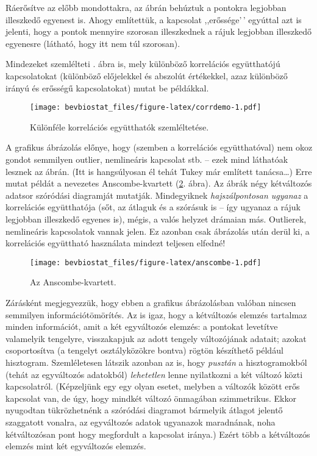 \documentclass[
]{book}
\begin{document}
Ráerősítve az előbb mondottakra, az ábrán behúztuk a pontokra legjobban illeszkedő egyenest is. Ahogy említettük, a kapcsolat ,,erőssége'\,' egyúttal azt is jelenti, hogy a pontok mennyire szorosan illeszkednek a rájuk legjobban illeszkedő egyenesre (látható, hogy itt nem túl szorosan).

Mindezeket szemlélteti . ábra is, mely különböző korrelációs együtthatójú kapcsolatokat (különböző előjelekkel és abszolút értékekkel, azaz különböző irányú és erősségű kapcsolatokat) mutat be példákkal.

\begin{figure}
\centering
\texttt{[image: bevbiostat\_files/figure-latex/corrdemo-1.pdf]}
\caption{\label{fig:corrdemo}Különféle korrelációs együtthatók szemléltetése.}
\end{figure}

A grafikus ábrázolás előnye, hogy (szemben a korrelációs együtthatóval) nem okoz gondot semmilyen outlier, nemlineáris kapcsolat stb. -- ezek mind láthatóak lesznek az ábrán. (Itt is hangsúlyosan él tehát Tukey már említett tanácsa\dots{}) Erre mutat példát a nevezetes Anscombe-kvartett (\ref{fig:anscombe}. ábra). Az ábrák négy kétváltozós adatsor szóródási diagramját mutatják. Mindegyiknek \emph{hajszálpontosan ugyanaz} a korrelációs együtthatója (sőt, az átlaguk és a szórásuk is -- így ugyanaz a rájuk legjobban illeszkedő egyenes is), mégis, a valós helyzet drámaian más. Outlierek, nemlineáris kapcsolatok vannak jelen. Ez azonban csak ábrázolás után derül ki, a korrelációs együttható használata mindezt teljesen elfedné!

\begin{figure}
\centering
\texttt{[image: bevbiostat\_files/figure-latex/anscombe-1.pdf]}
\caption{\label{fig:anscombe}Az Anscombe-kvartett.}
\end{figure}

Zárásként megjegyezzük, hogy ebben a grafikus ábrázolásban valóban nincsen semmilyen információtömörítés. Az is igaz, hogy a kétváltozós elemzés tartalmaz minden információt, amit a két egyváltozós elemzés: a pontokat levetítve valamelyik tengelyre, visszakapjuk az adott tengely változójának adatait; azokat csoportosítva (a tengelyt osztályközökre bontva) rögtön készíthető például hisztogram. Szemléletesen látszik azonban az is, hogy \emph{pusztán} a hisztogramokból (tehát az egyváltozós adatokból) \emph{lehetetlen} lenne nyilatkozni a két változó közti kapcsolatról. (Képzeljünk egy egy olyan esetet, melyben a változók között erős kapcsolat van, de úgy, hogy mindkét változó önmagában szimmetrikus. Ekkor nyugodtan tükrözhetnénk a szóródási diagramot bármelyik átlagot jelentő szaggatott vonalra, az egyváltozós adatok ugyanazok maradnának, noha kétváltozósan pont hogy megfordult a kapcsolat iránya.) Ezért több a kétváltozós elemzés mint két egyváltozós elemzés.
\end{document}
